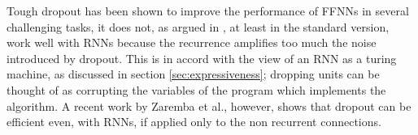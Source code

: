 Tough dropout has been shown \cite{dropout} to improve the performance of FFNNs in several challenging tasks, it does not, as argued in \cite{dropoutBayer}, at least in the standard version, work well with RNNs because the recurrence amplifies too much the noise introduced by dropout. This is in accord with the view of an RNN as a turing machine, as discussed in section \ref{sec:expressiveness}; dropping units can be thought of as corrupting the variables of the program which implements the algorithm.
A recent work by Zaremba et al., however, shows that dropout can be efficient even, with RNNs, if applied only to the non recurrent connections\cite{dropoutRNNs}.

